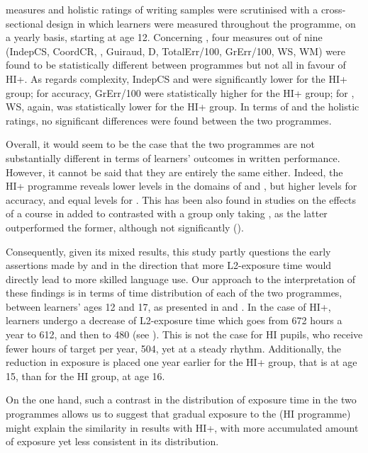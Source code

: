 \documentclass[output=paper]{langsci/langscibook}
\begin{document}
 measures and holistic ratings of writing samples were scrutinised with a cross-sectional design in which learners were measured throughout the programme, on a yearly basis, starting at age 12. Concerning , four measures out of nine (IndepCS, CoordCR, , Guiraud, D, TotalErr/100, GrErr/100, WS, WM) were found to be statistically different between programmes but not all in favour of HI+.  As regards complexity, IndepCS and   were significantly lower for the HI+ group;  for accuracy, GrErr/100 were statistically higher for the HI+ group;  for , WS, again, was statistically lower for the HI+ group. In terms of  and the holistic ratings, no significant differences were found between the two programmes. 

Overall, it would seem to be the case that the two programmes are not substantially different in terms of learners’ outcomes in  written performance. However, it cannot be said that they are entirely the same either. Indeed, the HI+ programme reveals lower levels in the domains of  and , but higher levels for accuracy, and equal levels for .  This has been also found in studies on the effects of a  course in  added to  contrasted with a group only taking , as the latter outperformed the former, although not significantly (\citealt{RoquetPérez-Vidal2015}). 

Consequently, given its mixed results, this study partly questions the early assertions made by \citet{Carroll1962} and \citet{Stern1985} in the direction that more L2-exposure time would directly lead to more skilled language use. Our approach to the interpretation of these findings is in terms of time distribution of each of the two programmes, between learners’ ages 12 and 17, as presented in  and . In the case of HI+, learners undergo a decrease of L2-exposure time which goes from 672 hours a year to 612, and then to 480 (see ). This is not the case for HI pupils, who  receive fewer hours of target  per year, 504, yet at a steady rhythm. Additionally, the reduction in exposure is placed one year earlier for the HI+ group, that is at age 15,  than for the HI group, at age 16.

 On the one hand, such a contrast in the distribution of  exposure time in the two programmes allows us to suggest that gradual exposure to the  (HI programme) might explain the similarity in results with HI+, with more accumulated amount of  exposure yet less consistent in its distribution.
\end{document}
